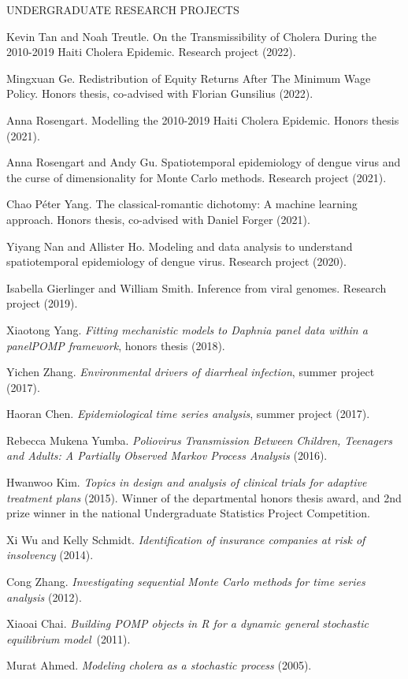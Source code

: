 \lsp
\begin{reflist}{UNDERGRADUATE RESEARCH PROJECTS}
  
\item{Kevin Tan and Noah Treutle}. On the Transmissibility of Cholera During the 2010-2019 Haiti Cholera Epidemic. Research project (2022).
\item{Mingxuan Ge}. Redistribution of Equity Returns After The Minimum Wage Policy. Honors thesis, co-advised with Florian Gunsilius (2022).
\item{Anna Rosengart}. Modelling the 2010-2019 Haiti Cholera Epidemic. Honors thesis (2021).
\item{Anna Rosengart and Andy Gu}. Spatiotemporal epidemiology of dengue virus and the curse of dimensionality for Monte Carlo methods. Research project (2021).
  \item{Chao P{\'e}ter Yang}. The classical-romantic dichotomy: A machine learning approach. Honors thesis, co-advised with Daniel Forger (2021).
  \item{Yiyang Nan and Allister Ho}. Modeling and data analysis to understand spatiotemporal epidemiology of dengue virus. Research project (2020).
  \item{Isabella Gierlinger and William Smith}. Inference from viral genomes. Research project (2019).
  \item{Xiaotong Yang}. {\em Fitting mechanistic models to Daphnia panel data within a panelPOMP framework}, honors thesis (2018).
\item{Yichen Zhang}. {\em Environmental drivers of diarrheal infection}, summer project (2017).
\item{Haoran Chen}. {\em Epidemiological time series analysis}, summer project (2017).
\item{Rebecca Mukena Yumba}.  {\em Poliovirus Transmission Between Children, Teenagers and Adults: A Partially Observed Markov Process Analysis} (2016).
\item{Hwanwoo Kim}. {\em Topics in design and analysis of clinical trials for adaptive treatment plans} (2015). Winner of the departmental honors thesis award, and 2nd prize winner in the national Undergraduate Statistics Project Competition.
\item{Xi Wu and Kelly Schmidt}. {\em Identification of insurance companies at risk of insolvency} (2014).
\item{Cong Zhang}. {\em Investigating sequential Monte Carlo methods for time series analysis} (2012).
\item{Xiaoai Chai}. {\em Building POMP objects in R for a dynamic general stochastic equilibrium model}~(2011).  
\item{Murat Ahmed}. {\em Modeling cholera as a stochastic process} (2005).

\end{reflist}


